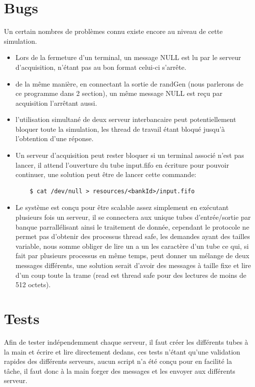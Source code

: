 \documentclass[french, a4paper, 12pt, titlepage]{article}
\begin{document}
\section{Bugs}
Un certain nombres de problèmes connu existe encore au niveau de cette simulation.
\begin{itemize}
\item Lors de la fermeture d'un terminal, un message NULL est lu par le serveur d'acquisition, n'étant pas au bon format celui-ci s'arrête.
\item de la même manière, en connectant la sortie de randGen (nous parlerons de ce programme dans 2 section), un même message NULL est reçu par acquisition l'arrêtant aussi.
\item l'utilisation simultané de deux serveur interbancaire peut potentiellement bloquer toute la simulation, les thread de travail étant bloqué jusqu'à l'obtention d'une réponse.
\item Un serveur d'acquisition peut rester bloquer si un terminal associé n'est pas lancer, il attend l'ouverture du tube \og input.fifo\fg{} en écriture pour pouvoir continuer, une solution peut être de lancer cette commande:\\
\vspace{-1em}
\begin{verbatim}
	$ cat /dev/null > resources/<bankId>/input.fifo
\end{verbatim}
\item Le système est conçu pour être scalable assez simplement en exécutant plusieurs fois un serveur, il se connectera aux unique tubes d'entrée/sortie par banque parrallélisant ainsi le traitement de donnée, cependant le protocole ne permet pas d'obtenir des processus \og thread safe\fg{}, les demandes ayant des tailles variable, nous somme obliger de lire un a un les caractère d'un tube ce qui, si fait par plusieurs processus en même temps, peut donner un mélange de deux messages différents, une solution serait d'avoir des messages à taille fixe et lire d'un coup toute la trame (read est thread safe pour des lectures de moins de 512 octets).
\end{itemize}

\section{Tests}
Afin de tester indépendemment chaque serveur, il faut créer les différents tubes à la main et écrire et lire directement dedans, ces tests n'étant qu'une validation rapides des différents serveurs, aucun script n'a été conçu pour en facilité la tâche, il faut donc à la main forger des messages et les envoyer aux différents serveur.\\
\end{document}
